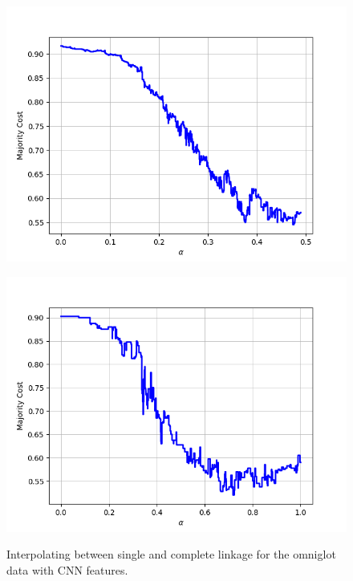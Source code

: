 \begin{figure}[H]
\begin{minipage}{.24\textwidth}
  {\includegraphics[width=\linewidth]{plots/omniglot-intra-sc-cnn/Tagalog}}
\end{minipage}
\begin{minipage}{.24\textwidth}
  \centering
  {\includegraphics[width=\linewidth]{plots/omniglot-intra-sc-cnn/Tifinagh}}
\end{minipage}
\caption{%
  Interpolating between single and complete linkage for the omniglot data with CNN features.}
\label{}
\end{figure}